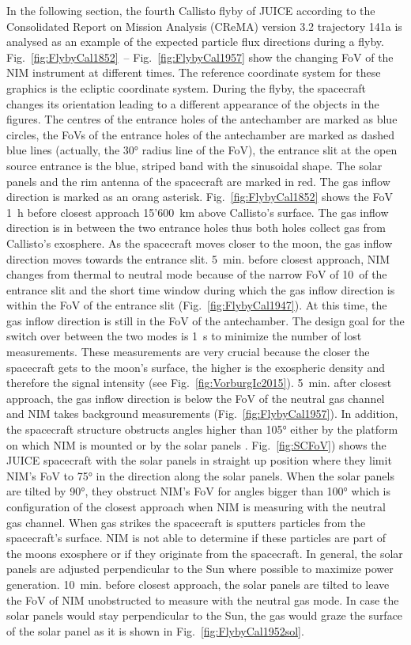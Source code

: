 	In the following section, the fourth Callisto flyby of JUICE according to the Consolidated Report on Mission Analysis (CReMA) version 3.2 trajectory 141a \cite{SOC_Crema3p2} is analysed as an example of the expected particle flux directions during a flyby. Fig.~\ref{fig:FlybyCal1852}~-- Fig.~\ref{fig:FlybyCal1957} show the changing FoV of the NIM instrument at different times. The reference coordinate system for these graphics is the ecliptic coordinate system. During the flyby, the spacecraft changes its orientation leading to a different appearance of the objects in the figures. The centres of the entrance holes of the antechamber are marked as blue circles, the FoVs of the entrance holes of the antechamber are marked as dashed blue lines (actually, the 30° radius line of the FoV), the entrance slit at the open source entrance is the blue, striped band with the sinusoidal shape. The solar panels and the rim antenna of the spacecraft are marked in red. The gas inflow direction is marked as an orang asterisk. Fig.~\ref{fig:FlybyCal1852} shows the FoV 1~h before closest approach 15'600~km above Callisto's surface. The gas inflow direction is in between the two entrance holes thus both holes collect gas from Callisto's exosphere. As the spacecraft moves closer to the moon, the gas inflow direction moves towards the entrance slit. 5~min. before closest approach, NIM changes from thermal to neutral mode because of the narrow FoV of 10\degree~of the entrance slit and the short time window during which the gas inflow direction is within the FoV of the entrance slit (Fig.~\ref{fig:FlybyCal1947}). At this time, the gas inflow direction is still in the FoV of the antechamber. The design goal for the switch over between the two modes is 1~s to minimize the number of lost measurements. These measurements are very crucial because the closer the spacecraft gets to the moon's surface, the higher is the exospheric density and therefore the signal intensity (see Fig.~\ref{fig:VorburgIc2015}). 5~min. after closest approach, the gas inflow direction is below the FoV of the neutral gas channel and NIM takes background measurements (Fig.~\ref{fig:FlybyCal1957}). In addition, the spacecraft structure obstructs angles higher than 105° either by the platform on which NIM is mounted or by the solar panels \cite{NIM_FoV}. Fig.~\ref{fig:SCFoV}) shows the JUICE spacecraft with the solar panels in straight up position where they limit NIM's FoV to 75° in the direction along the solar panels. When the solar panels are tilted by 90°, they obstruct NIM's FoV for angles bigger than 100° which is configuration of the closest approach when NIM is measuring with the neutral gas channel. When gas strikes the spacecraft is sputters particles from the spacecraft's surface. NIM is not able to determine if these particles are part of the moons exosphere or if they originate from the spacecraft. In general, the solar panels are adjusted perpendicular to the Sun where possible to maximize power generation. 10~min. before closest approach, the solar panels are tilted to leave the FoV of NIM unobstructed to measure with the neutral gas mode. In case the solar panels would stay perpendicular to the Sun, the gas would graze the surface of the solar panel as it is shown in Fig.~\ref{fig:FlybyCal1952sol}. 